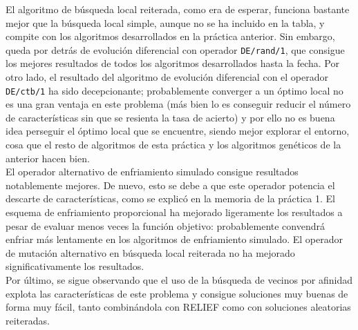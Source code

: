 \documentclass{article}
\begin{document}
El algoritmo de búsqueda local reiterada, como era de esperar, funciona bastante mejor que la búsqueda local simple, aunque no se ha incluido en la tabla, y compite con los algoritmos desarrollados en la práctica anterior. Sin embargo, queda por detrás de evolución diferencial con operador \texttt{DE/rand/1}, que consigue los mejores resultados de todos los algoritmos desarrollados hasta la fecha. Por otro lado, el resultado del algoritmo de evolución diferencial con el operador \texttt{DE/ctb/1} ha sido decepcionante; probablemente converger a un óptimo local no es una gran ventaja en este problema (más bien lo es conseguir reducir el número de características sin que se resienta la tasa de acierto) y por ello no es buena idea perseguir el óptimo local que se encuentre, siendo mejor explorar el entorno, cosa que el resto de algoritmos de esta práctica y los algoritmos genéticos de la anterior hacen bien. \\

El operador alternativo de enfriamiento simulado consigue resultados notablemente mejores. De nuevo, esto se debe a que este operador potencia el descarte de características, como se explicó en la memoria de la práctica 1. El esquema de enfriamiento proporcional ha mejorado ligeramente los resultados a pesar de evaluar menos veces la función objetivo: probablemente convendrá enfriar más lentamente en los algoritmos de enfriamiento simulado. El operador de mutación alternativo en búsqueda local reiterada no ha mejorado significativamente los resultados. \\

Por último, se sigue observando que el uso de la búsqueda de vecinos por afinidad explota las características de este problema y consigue soluciones muy buenas de forma muy fácil, tanto combinándola con RELIEF como con soluciones aleatorias reiteradas.
\end{document}
